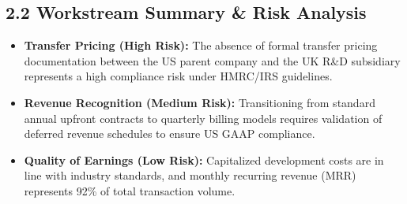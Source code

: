 \subsection{2.2 Workstream Summary \& Risk Analysis}
\begin{itemize}[leftmargin=*]
  \item \textbf{Transfer Pricing (High Risk):} The absence of formal transfer pricing documentation between the US parent company and the UK R\&D subsidiary represents a high compliance risk under HMRC/IRS guidelines.
  \item \textbf{Revenue Recognition (Medium Risk):} Transitioning from standard annual upfront contracts to quarterly billing models requires validation of deferred revenue schedules to ensure US GAAP compliance.
  \item \textbf{Quality of Earnings (Low Risk):} Capitalized development costs are in line with industry standards, and monthly recurring revenue (MRR) represents 92\% of total transaction volume.
\end{itemize}
